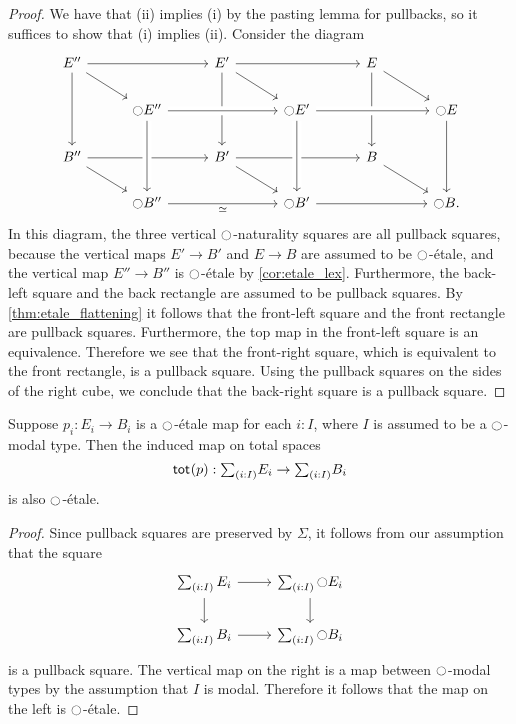 \documentclass[9pt,twosided]{amsart}
\begin{document}
  \begin{proof}
    We have that (ii) implies (i) by the pasting lemma for pullbacks, so it suffices to show that (i) implies (ii). Consider the diagram
    \begin{equation*}
      \begin{tikzcd}
        E'' \arrow[rr] \arrow[dd] \arrow[dr] & \phantom{\modal E''} & E' \arrow[rr] \arrow[dd] \arrow[dr] & \phantom{\modal E''} & E \arrow[dd] \arrow[dr] & \phantom{\modal E''} \\
        \phantom{\modal E''} & \modal E'' \arrow[rr,crossing over] & \phantom{\modal E''} & \modal E' \arrow[rr,crossing over] & \phantom{\modal E''} & \modal E \arrow[dd] \\
        B'' \arrow[dr] \arrow[rr] & & B' \arrow[dr] \arrow[rr] & & B \arrow[dr] \\
        & \modal B'' \arrow[from=uu,crossing over] \arrow[rr,swap,"\simeq"] & & \modal B' \arrow[from=uu,crossing over] \arrow[rr] & & \modal B.
      \end{tikzcd}
    \end{equation*}
    In this diagram, the three vertical ${\ocircle}$-naturality squares are all pullback squares, because the vertical maps $E'\to B'$ and $E\to B$ are assumed to be ${\ocircle}$-\'etale, and the vertical map $E''\to B''$ is ${\ocircle}$-\'etale by \cref{cor:etale_lex}. Furthermore, the back-left square and the back rectangle are assumed to be pullback squares. By \cref{thm:etale_flattening} it follows that the front-left square and the front rectangle are pullback squares. Furthermore, the top map in the front-left square is an equivalence. Therefore we see that the front-right square, which is equivalent to the front rectangle, is a pullback square. Using the pullback squares on the sides of the right cube, we conclude that the back-right square is a pullback square.
  \end{proof}

\begin{prp}\label{prop:R-stable}
  Suppose $p_i:E_i\to B_i$ is a ${\ocircle}$-\'etale map for each $i:I$, where $I$ is assumed to be a ${\ocircle}$-modal type. Then the induced map on total spaces
  \begin{equation*}
    \total{p} : \sm{i:I}E_i\to \sm{i:I}B_i
  \end{equation*}
  is also ${\ocircle}$-\'etale.
\end{prp}

\begin{proof}
  Since pullback squares are preserved by $\Sigma$, it follows from our assumption that the square
  \begin{equation*}
    \begin{tikzcd}
      \sm{i:I}E_i \arrow[r] \arrow[d] & \sm{i:I}\modal E_i \arrow[d] \\
      \sm{i:I}B_i \arrow[r] & \sm{i:I}\modal B_i
    \end{tikzcd}
  \end{equation*}
  is a pullback square. The vertical map on the right is a map between ${\ocircle}$-modal types by the assumption that $I$ is modal. Therefore it follows that the map on the left is ${\ocircle}$-\'etale.
\end{proof}
\end{document}
